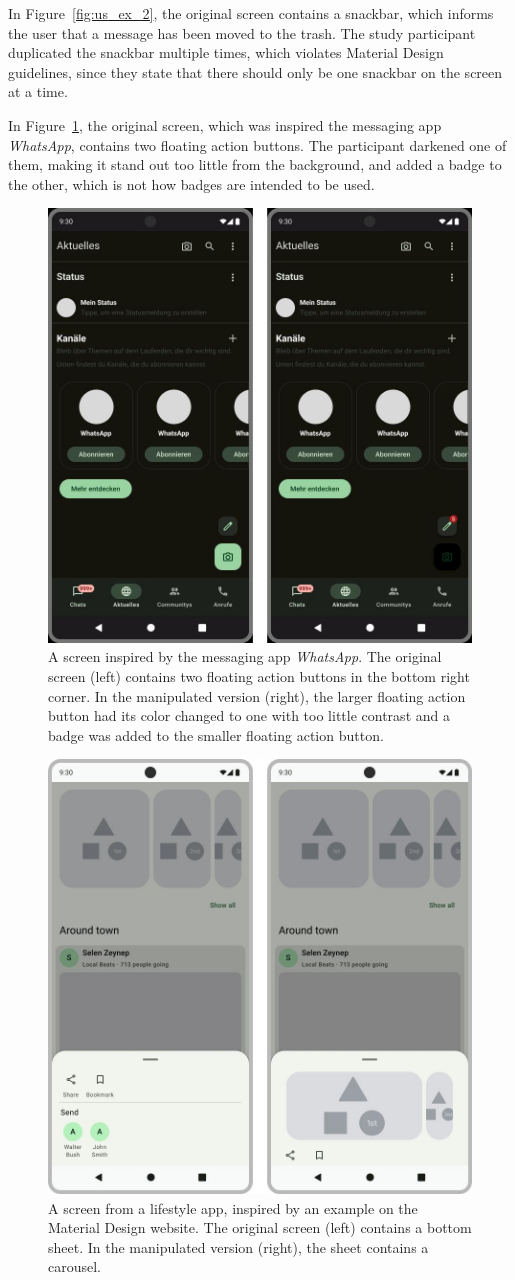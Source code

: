 \documentclass[11pt,titlepage,oneside,openany]{book}
\begin{document}
In Figure~\ref{fig:us_ex_2}, the original screen contains a snackbar, which informs the user that a message has been moved to the trash. The study participant duplicated the snackbar multiple times, which violates Material Design guidelines, since they state that there should only be one snackbar on the screen at a time. 

In Figure~\ref{fig:us_ex_3}, the original screen, which was inspired the messaging app {\emph{WhatsApp}}, contains two floating action buttons. The participant darkened one of them, making it stand out too little from the background, and added a badge to the other, which is not how badges are intended to be used. 

\begin{figure}[H]
	\centering
	\includegraphics[width=.6\textwidth]{figures/us_ex_3.jpg}
	\caption{A screen inspired by the messaging app \emph{WhatsApp}. The original screen (left) contains two floating action buttons in the bottom right corner. In the manipulated version (right), the larger floating action button had its color changed to one with too little contrast and a badge was added to the smaller floating action button.}
	\label{fig:us_ex_3}
\end{figure}

\begin{figure}[H]
	\centering
	\includegraphics[width=.6\textwidth]{figures/us_ex_4.jpg}
	\caption{A screen from a lifestyle app, inspired by an example on the Material Design website. The original screen (left) contains a bottom sheet. In the manipulated version (right), the sheet contains a carousel.}
	\label{fig:us_ex_4}
\end{figure}
\end{document}
